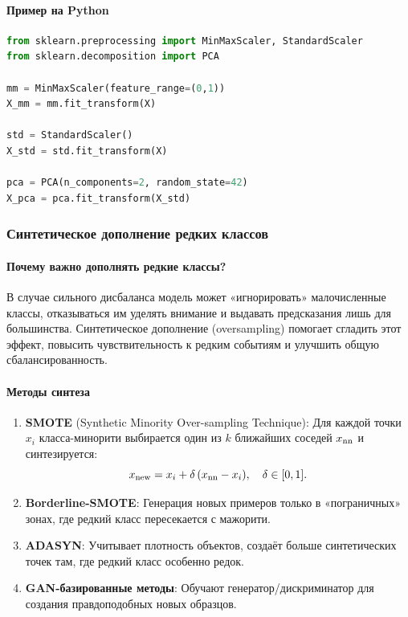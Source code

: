 \paragraph{Пример на Python}
\begin{lstlisting}[language=Python]
from sklearn.preprocessing import MinMaxScaler, StandardScaler
from sklearn.decomposition import PCA

mm = MinMaxScaler(feature_range=(0,1))
X_mm = mm.fit_transform(X)

std = StandardScaler()
X_std = std.fit_transform(X)

pca = PCA(n_components=2, random_state=42)
X_pca = pca.fit_transform(X_std)
\end{lstlisting}

\subsubsection{Синтетическое дополнение редких классов}
\label{sec:oversampling}

\paragraph{Почему важно дополнять редкие классы?}  
В случае сильного дисбаланса модель может «игнорировать» малочисленные классы, отказываться им уделять внимание и выдавать предсказания лишь для большинства. Синтетическое дополнение (oversampling) помогает сгладить этот эффект, повысить чувствительность к редким событиям и улучшить общую сбалансированность.

\paragraph{Методы синтеза}
\begin{enumerate}
  \item \textbf{SMOTE} (Synthetic Minority Over-sampling Technique):  
    Для каждой точки \(x_i\) класса-минорити выбирается один из \(k\) ближайших соседей \(x_{\rm nn}\) и синтезируется:
    \[
      x_{\rm new} = x_i + \delta\,(x_{\rm nn} - x_i),\quad \delta\in[0,1].
    \]
  \item \textbf{Borderline-SMOTE}:  
    Генерация новых примеров только в «пограничных» зонах, где редкий класс пересекается с мажорити.
  \item \textbf{ADASYN}:  
    Учитывает плотность объектов, создаёт больше синтетических точек там, где редкий класс особенно редок.
  \item \textbf{GAN-базированные методы}:  
    Обучают генератор/дискриминатор для создания правдоподобных новых образцов.
\end{enumerate}

